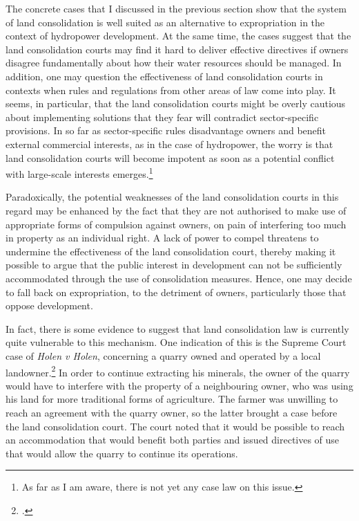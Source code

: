 The concrete cases that I discussed in the previous section show that the system of land consolidation is well suited as an alternative to expropriation in the context of hydropower development. At the same time, the cases suggest that the land consolidation courts may find it hard to deliver effective directives if owners disagree fundamentally about how their water resources should be managed. In addition, one may question the effectiveness of land consolidation courts in contexts when rules and regulations from other areas of law come into play. It seems, in particular, that the land consolidation courts might be overly cautious about implementing solutions that they fear will contradict sector-specific provisions. In so far as sector-specific rules disadvantage owners and benefit external commercial interests, as in the case of hydropower, the worry is that land consolidation courts will become impotent as soon as a potential conflict with large-scale interests emerges.\footnote{As far as I am aware, there is not yet any case law on this issue.}

Paradoxically, the potential weaknesses of the land consolidation courts in this regard may be enhanced by the fact that they are not authorised to make use of appropriate forms of compulsion against owners, on pain of interfering too much in property as an individual right. A lack of power to compel threatens to undermine the effectiveness of the land consolidation court, thereby making it possible to argue that the public interest in development can not be sufficiently accommodated through the use of consolidation measures. Hence, one may decide to fall back on expropriation, to the detriment of owners, particularly those that oppose development.

In fact, there is some evidence to suggest that land consolidation law is currently quite vulnerable to this mechanism. One indication of this is the Supreme Court case of {\it Holen v Holen}, concerning a quarry owned and operated by a local landowner.\footcite{holen95} In order to continue extracting his minerals, the owner of the quarry would have to interfere with the property of a neighbouring owner, who was using his land for more traditional forms of agriculture. The farmer was unwilling to reach an agreement with the quarry owner, so the latter brought a case before the land consolidation court. The court noted that it would be possible to reach an accommodation that would benefit both parties and issued directives of use that would allow the quarry to continue its operations.

